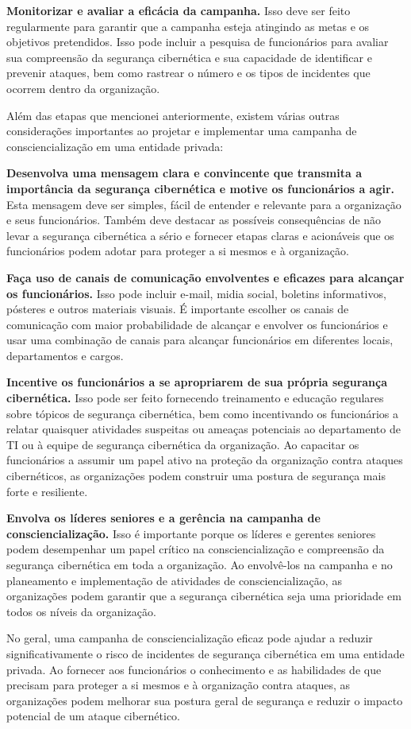 \textbf{Monitorizar e avaliar a eficácia da campanha.} Isso deve ser feito regularmente para garantir que a campanha esteja atingindo as metas e os objetivos pretendidos. Isso pode incluir a pesquisa de funcionários para avaliar sua compreensão da segurança cibernética e sua capacidade de identificar e prevenir ataques, bem como rastrear o número e os tipos de incidentes que ocorrem dentro da organização.

Além das etapas que mencionei anteriormente, existem várias outras considerações importantes ao projetar e implementar uma campanha de consciencialização em uma entidade privada:

\textbf{Desenvolva uma mensagem clara e convincente que transmita a importância da segurança cibernética e motive os funcionários a agir.} Esta mensagem deve ser simples, fácil de entender e relevante para a organização e seus funcionários. Também deve destacar as possíveis consequências de não levar a segurança cibernética a sério e fornecer etapas claras e acionáveis que os funcionários podem adotar para proteger a si mesmos e à organização.

\textbf{Faça uso de canais de comunicação envolventes e eficazes para alcançar os funcionários.} Isso pode incluir e-mail, midia social, boletins informativos, pósteres e outros materiais visuais. É importante escolher os canais de comunicação com maior probabilidade de alcançar e envolver os funcionários e usar uma combinação de canais para alcançar funcionários em diferentes locais, departamentos e cargos.

\textbf{Incentive os funcionários a se apropriarem de sua própria segurança cibernética.} Isso pode ser feito fornecendo treinamento e educação regulares sobre tópicos de segurança cibernética, bem como incentivando os funcionários a relatar quaisquer atividades suspeitas ou ameaças potenciais ao departamento de TI ou à equipe de segurança cibernética da organização. Ao capacitar os funcionários a assumir um papel ativo na proteção da organização contra ataques cibernéticos, as organizações podem construir uma postura de segurança mais forte e resiliente.

\textbf{Envolva os líderes seniores e a gerência na campanha de consciencialização.} Isso é importante porque os líderes e gerentes seniores podem desempenhar um papel crítico na consciencialização e compreensão da segurança cibernética em toda a organização. Ao envolvê-los na campanha e no planeamento e implementação de atividades de consciencialização, as organizações podem garantir que a segurança cibernética seja uma prioridade em todos os níveis da organização.

No geral, uma campanha de consciencialização eficaz pode ajudar a reduzir significativamente o risco de incidentes de segurança cibernética em uma entidade privada. Ao fornecer aos funcionários o conhecimento e as habilidades de que precisam para proteger a si mesmos e à organização contra ataques, as organizações podem melhorar sua postura geral de segurança e reduzir o impacto potencial de um ataque cibernético.

\newpage
